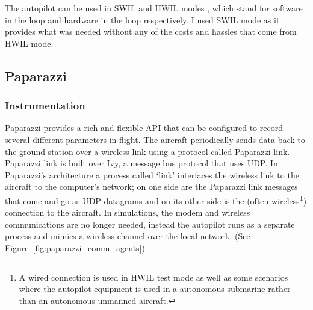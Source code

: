 
The autopilot can be used in SWIL and HWIL modes \cite{melmoth2019true}, which stand for software in the loop and hardware in the loop respectively. I used SWIL mode as it provides what was needed without any of the costs and hassles that come from HWIL mode. 

\subsection{Paparazzi}\label{sec:paparazzi_data_collection}

\subsubsection{Instrumentation}
Paparazzi provides a rich and flexible API that can be configured to record several different parameters in flight. The aircraft periodically sends data back to the ground station over a wireless link using a protocol called Paparazzi link. Paparazzi link is built over Ivy, a message bus protocol that uses UDP. 
In Paparazzi's architecture a process called `link' interfaces the wireless link to the aircraft to the computer's network; on one side are the Paparazzi link messages that come and go as UDP datagrams and on its other side is the (often wireless\footnote{A wired connection is used in HWIL test mode as well as some scenarios where the autopilot equipment is used in a autonomous submarine rather than an autonomous unmanned aircraft.}) connection to the aircraft.
In simulations, the modem and wireless communications are no longer needed, instead the autopilot runs as a separate process and mimics a wireless channel over the local network. (See Figure~\ref{fig:paparazzi_comm_agents})

